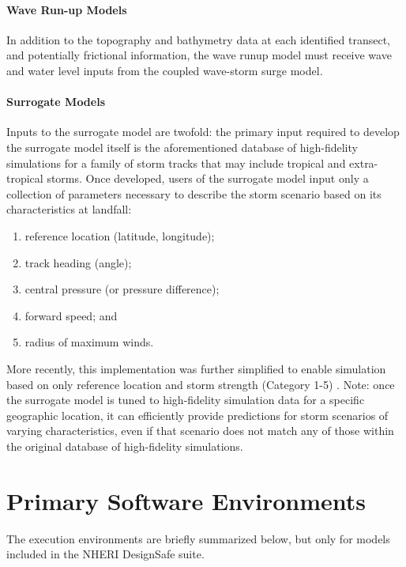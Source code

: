 \paragraph{Wave Run-up Models} In addition to the topography and bathymetry data at each identified transect, and potentially frictional information, the wave runup model must receive wave and water level inputs from the coupled wave-storm surge model.


\paragraph{Surrogate Models} Inputs to the surrogate model are twofold: the primary input required to develop the surrogate model itself is the aforementioned database of high-fidelity simulations for a family of storm tracks that may include tropical and extra-tropical storms. Once developed, users of the surrogate model input only a collection of parameters necessary to describe the storm scenario based on its characteristics at landfall: 

\begin{enumerate}
    \item reference location (latitude, longitude);
    \item track heading (angle);
    \item central pressure (or pressure difference);
    \item forward speed; and
    \item radius of maximum winds.
\end{enumerate}

More recently, this implementation was further simplified to enable simulation based on only reference location and storm strength (Category 1-5) \citep{njcoast2018implementation}. Note: once the surrogate model is tuned to high-fidelity simulation data for a specific geographic location, it can efficiently provide predictions for storm scenarios of varying characteristics, even if that scenario does not match any of those within the original database of high-fidelity simulations. 

\section{Primary Software Environments}
\label{sec:storm_surge_tools}

The execution environments are briefly summarized below, but only for models included in the NHERI DesignSafe suite. 

